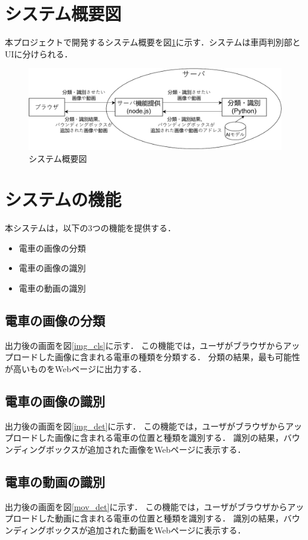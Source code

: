 \section{システム概要図}
本プロジェクトで開発するシステム概要を図\ref{FIG}に示す．システムは車両判別部とUIに分けられる．

\begin{figure}
	\centering
	\includegraphics [width=\linewidth]{chap2/fig/sys_gaiyou6.pdf}
	\caption{システム概要図}
	\label{FIG}
\end{figure}

\section{システムの機能}
本システムは，以下の3つの機能を提供する．
\begin{itemize}
	\item 電車の画像の分類
	\item 電車の画像の識別
	\item 電車の動画の識別
\end{itemize}

\subsection{電車の画像の分類} 
出力後の画面を図\ref{img_cls}に示す．
この機能では，ユーザがブラウザからアップロードした画像に含まれる電車の種類を分類する． 分類の結果，最も可能性が高いものをWebページに出力する．
\subsection{電車の画像の識別}
出力後の画面を図\ref{img_det}に示す．
この機能では，ユーザがブラウザからアップロードした画像に含まれる電車の位置と種類を識別する．  識別の結果，バウンディングボックスが追加された画像をWebページに表示する．
\subsection{電車の動画の識別} 
出力後の画面を図\ref{mov_det}に示す．
この機能では，ユーザがブラウザからアップロードした動画に含まれる電車の位置と種類を識別する． 識別の結果，バウンディングボックスが追加された動画をWebページに表示する．

